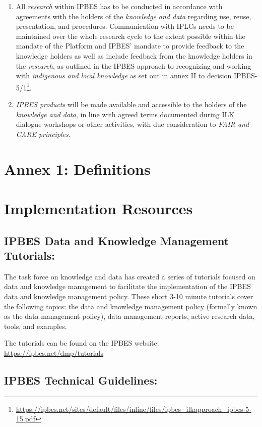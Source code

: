 \documentclass{article}
\begin{document}
\begin{enumerate}[label=(\alph*)]
    \item All \textit{research} within IPBES has to be conducted in accordance with agreements with the holders of the \textit{knowledge and data} regarding use, reuse, presentation, and procedures. Communication with IPLCs needs to be maintained over the whole research cycle to the extent possible within the mandate of the Platform and IPBES’ mandate to provide feedback to the knowledge holders as well as include feedback from the knowledge holders in the \textit{research}, as outlined in the IPBES approach to recognizing and working with \textit{indigenous and local knowledge} as set out in annex II to decision IPBES-5/1\footnote{\url{https://ipbes.net/sites/default/files/inline/files/ipbes_ilkapproach_ipbes-5-15.pdf}}.
    
    \item \textit{IPBES products} will be made available and accessible to the holders of the \textit{knowledge and data}, in line with agreed terms documented during ILK dialogue workshops or other activities, with due consideration to \textit{FAIR and CARE principles}.
\end{enumerate}

\section*{Annex 1: Definitions}

\printglossary

\section*{Implementation Resources}
\subsection*{IPBES Data and Knowledge Management Tutorials:}

The task force on knowledge and data has created a series of tutorials focused on data and knowledge management to facilitate the implementation of the IPBES data and knowledge management policy. These short 3-10 minute tutorials cover the following topics: the data and knowledge management policy (formally known as the data management policy), data management reports, active research data, tools, and examples.

The tutorials can be found on the IPBES website: \href{https://ipbes.net/dmp/tutorials}{https://ipbes.net/dmp/tutorials}

\subsection*{IPBES Technical Guidelines:}
\end{document}
